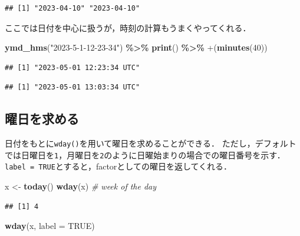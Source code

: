 \documentclass[
]{article}
\newenvironment{Shaded}{\begin{snugshade}}{\end{snugshade}}
\newcommand{\AttributeTok}[1]{\textcolor[rgb]{0.13,0.29,0.53}{#1}}
\newcommand{\CommentTok}[1]{\textcolor[rgb]{0.56,0.35,0.01}{\textit{#1}}}
\newcommand{\ConstantTok}[1]{\textcolor[rgb]{0.56,0.35,0.01}{#1}}
\newcommand{\DecValTok}[1]{\textcolor[rgb]{0.00,0.00,0.81}{#1}}
\newcommand{\FunctionTok}[1]{\textcolor[rgb]{0.13,0.29,0.53}{\textbf{#1}}}
\newcommand{\NormalTok}[1]{#1}
\newcommand{\OtherTok}[1]{\textcolor[rgb]{0.56,0.35,0.01}{#1}}
\newcommand{\SpecialCharTok}[1]{\textcolor[rgb]{0.81,0.36,0.00}{\textbf{#1}}}
\newcommand{\StringTok}[1]{\textcolor[rgb]{0.31,0.60,0.02}{#1}}
\begin{document}
\begin{verbatim}
## [1] "2023-04-10" "2023-04-10"
\end{verbatim}

ここでは日付を中心に扱うが，時刻の計算もうまくやってくれる．

\begin{Shaded}
\begin{Highlighting}[]
\FunctionTok{ymd\_hms}\NormalTok{(}\StringTok{"2023{-}5{-}1{-}12{-}23{-}34"}\NormalTok{) }\SpecialCharTok{\%\textgreater{}\%}
  \FunctionTok{print}\NormalTok{() }\SpecialCharTok{\%\textgreater{}\%}
  \StringTok{\textasciigrave{}}\AttributeTok{+}\StringTok{\textasciigrave{}}\NormalTok{(}\FunctionTok{minutes}\NormalTok{(}\DecValTok{40}\NormalTok{))}
\end{Highlighting}
\end{Shaded}

\begin{verbatim}
## [1] "2023-05-01 12:23:34 UTC"
\end{verbatim}

\begin{verbatim}
## [1] "2023-05-01 13:03:34 UTC"
\end{verbatim}

\hypertarget{ux66dcux65e5ux3092ux6c42ux3081ux308b}{%
\subsection{曜日を求める}\label{ux66dcux65e5ux3092ux6c42ux3081ux308b}}

日付をもとに\texttt{wday()}を用いて曜日を求めることができる．
ただし，デフォルトでは日曜日を\texttt{1}，月曜日を\texttt{2}のように日曜始まりの場合での曜日番号を示す．
\texttt{label\ =\ TRUE}とすると，factorとしての曜日を返してくれる．

\begin{Shaded}
\begin{Highlighting}[]
\NormalTok{x }\OtherTok{\textless{}{-}} \FunctionTok{today}\NormalTok{()}
\FunctionTok{wday}\NormalTok{(x) }\CommentTok{\# week of the day}
\end{Highlighting}
\end{Shaded}

\begin{verbatim}
## [1] 4
\end{verbatim}

\begin{Shaded}
\begin{Highlighting}[]
\FunctionTok{wday}\NormalTok{(x, }\AttributeTok{label =} \ConstantTok{TRUE}\NormalTok{)}
\end{Highlighting}
\end{Shaded}
\end{document}
